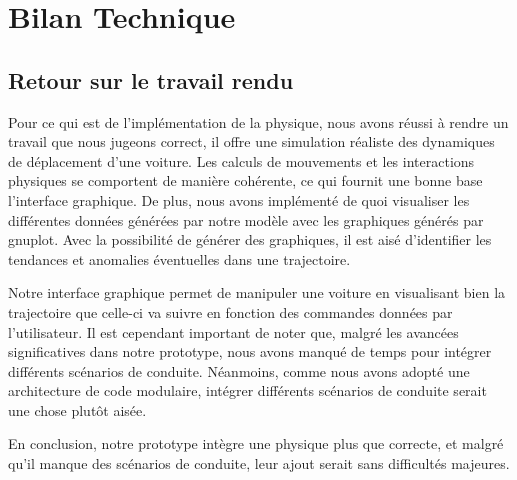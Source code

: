 \section{Bilan Technique}\label{sec:bilan-technique}

\subsection{Retour sur le travail rendu}\label{subsec:retour-sur-le-travail-rendu}
Pour ce qui est de l'implémentation de la physique, nous avons réussi à rendre un travail que nous jugeons correct, il offre une simulation réaliste des dynamiques de déplacement d'une voiture.
Les calculs de mouvements et les interactions physiques se comportent de manière cohérente, ce qui fournit une bonne base l'interface graphique.
De plus, nous avons implémenté de quoi visualiser les différentes données générées par notre modèle avec les graphiques générés par \gls{gnuplot}.
Avec la possibilité de générer des graphiques, il est aisé d'identifier les tendances et anomalies éventuelles dans une trajectoire.

Notre interface graphique permet de manipuler une voiture en visualisant bien la trajectoire que celle-ci va suivre en fonction des commandes données par l'utilisateur.
Il est cependant important de noter que, malgré les avancées significatives dans notre prototype, nous avons manqué de temps pour intégrer différents scénarios de conduite.
Néanmoins, comme nous avons adopté une architecture de code modulaire, intégrer différents scénarios de conduite serait une chose plutôt aisée.

En conclusion, notre prototype intègre une physique plus que correcte, et malgré qu'il manque des scénarios de conduite, leur ajout serait sans difficultés majeures.

